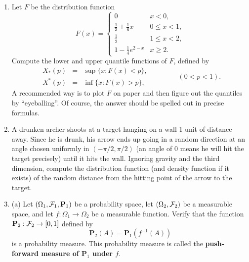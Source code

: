 \documentclass[12pt]{article}
\newcommand{\prob}{\mathbf{P}}
\theoremstyle{example}
\begin{document}
\begin{enumerate}
\bigskip\noindent
(b) $N$ letters addressed to different people are inserted at random into $N$ envelopes that are labelled with the names and addresses of the $N$ recipients, such that all $N!$ possible matchings between the letters and envelopes are equally likely. What is the probability of the event that no letter will arrive at its intended destination? Compute this probability for any $N$, and in the limit when $N\to\infty$.


\item Let $F$ be the distribution function
$$ F(x) = \begin{cases} 
0 & x < 0, \\ 
\frac13 + \frac16 x & 0\le x < 1, \\
\frac12 & 1\le x < 2, \\
1-\frac14e^{2-x} & x\ge 2.
\end{cases}
$$
Compute the lower and upper quantile functions of $F$, defined by
$$
\begin{array}{ccc} X_*(p) &=& \sup \{ x : F(x) < p \}, \\
X^*(p) &=& \inf \{ x : F(x) > p \},
\end{array} \qquad\qquad (0<p<1).
$$
A recommended way is to plot $F$ on paper and then figure out the quantiles by ``eyeballing''. Of course, the answer should be spelled out in precise formulas.

\item A drunken archer shoots at a target hanging on a wall 1 unit of distance away. Since he is drunk, his arrow ends up going in a random direction at an angle chosen uniformly in $(-\pi/2,\pi/2)$ (an angle of $0$ means he will hit the target precisely) until it hits the wall. Ignoring gravity and the third dimension, compute the distribution function (and density function if it exists) of the random distance from the hitting point of the arrow to the target.






\item 
 (a) Let $(\Omega_1, {\cal F}_1, \prob_1)$ be a probability space, let $(\Omega_2, {\cal F}_2)$ be a measurable space, and let $f:\Omega_1\to\Omega_2$ be a measurable function. Verify that the function $\prob_2:{\cal F}_2\to [0,1]$ defined by
$$\prob_2(A) = \prob_1(f^{-1}(A))$$
is a probability measure. This probability measure is called the \textbf{push-forward measure of $\prob_1$ under $f$}.


\end{enumerate}
\end{document}

